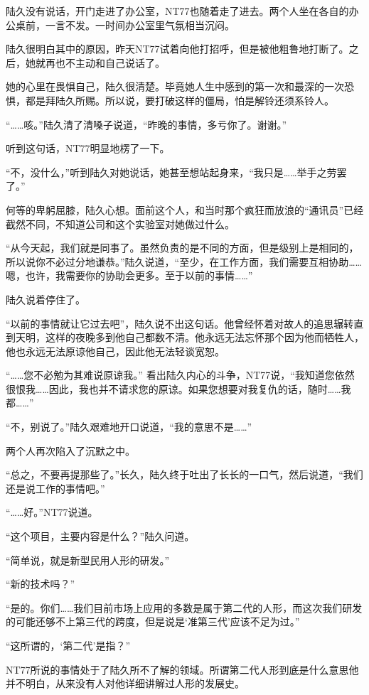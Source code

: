陆久没有说话，开门走进了办公室，NT77也随着走了进去。两个人坐在各自的办公桌前，一言不发。一时间办公室里气氛相当沉闷。

陆久很明白其中的原因，昨天NT77试着向他打招呼，但是被他粗鲁地打断了。之后，她就再也不主动和自己说话了。

她的心里在畏惧自己，陆久很清楚。毕竟她人生中感到的第一次和最深的一次恐惧，都是拜陆久所赐。所以说，要打破这样的僵局，怕是解铃还须系铃人。

“……咳。”陆久清了清嗓子说道，“昨晚的事情，多亏你了。谢谢。”

听到这句话，NT77明显地楞了一下。

“不，没什么，”听到陆久对她说话，她甚至想站起身来，“我只是……举手之劳罢了。”

何等的卑躬屈膝，陆久心想。面前这个人，和当时那个疯狂而放浪的“通讯员”已经截然不同，不知道公司和这个实验室对她做过什么。

“从今天起，我们就是同事了。虽然负责的是不同的方面，但是级别上是相同的，所以说你不必过分地谦恭。”陆久说道，“至少，在工作方面，我们需要互相协助……嗯，也许，我需要你的协助会更多。至于以前的事情……”

陆久说着停住了。

“以前的事情就让它过去吧”，陆久说不出这句话。他曾经怀着对故人的追思辗转直到天明，这样的夜晚多到他自己都数不清。他永远无法忘怀那个因为他而牺牲人，他也永远无法原谅他自己，因此他无法轻谈宽恕。

“……您不必勉为其难说原谅我。” 看出陆久内心的斗争，NT77说，“我知道您依然很恨我……因此，我也并不请求您的原谅。如果您想要对我复仇的话，随时……我都……”

“不，别说了。”陆久艰难地开口说道，“我的意思不是……”

两个人再次陷入了沉默之中。

“总之，不要再提那些了。”长久，陆久终于吐出了长长的一口气，然后说道，“我们还是说工作的事情吧。”

“……好。”NT77说道。

“这个项目，主要内容是什么？”陆久问道。

“简单说，就是新型民用人形的研发。”

“新的技术吗？”

“是的。你们……我们目前市场上应用的多数是属于第二代的人形，而这次我们研发的可能还够不上第三代的跨度，但是说是‘准第三代’应该不足为过。”

“这所谓的，‘第二代’是指？”

NT77所说的事情处于了陆久所不了解的领域。所谓第二代人形到底是什么意思他并不明白，从来没有人对他详细讲解过人形的发展史。

